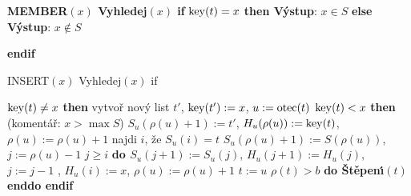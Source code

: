 {\bf MEMBER$(x)$\newline 
Vyhledej$(x)$\newline 
if} $\operatorname{key}(t)=x$ {\bf then V\'ystup}: $x\in S$ {\bf else V\'ystup}: $x\notin S$ {\bf endif
\medskip

INSERT$(x)$\newline
Vyhledej$(x)$\newline 
if} $\operatorname{key}(t)\ne x$ {\bf then}\newline 
\phantom{---}vytvo\v r nov\'y list $t'$, $\operatorname{key}(t'):=x$, $u:=\operatorname{otec}(t)$\newline 
\phantom{---}{\bf if} $\operatorname{key}(t)<x$ {\bf then}\newline 
(koment\'a\v r: $x>\max S$)\newline 
\phantom{------}$S_u(\rho (u)+1):=t'$, $H_u(\rho (u)):=\operatorname{key}(t)$, $\rho (u):=\rho 
(u)+1$\newline 
\phantom{---}{\bf else}\newline 
\phantom{------}najdi $i$, \v ze $S_u(i)=t$\newline 
\phantom{------}$S_u(\rho (u)+1):=S(\rho (u))$, $j:=\rho (u)-1$\newline 
\phantom{------}{\bf while} $j\ge i$ {\bf do\newline 
\phantom{---------}$S_u(j+1):=S_u(j)$}, $H_u(j+1):=H_u(j)$, $j:=j-1$\newline 
{}, $H_u(i):=x$, $\rho (u):=\rho (u)+1$\newline 
\phantom{---}{\bf endif}\newline 
\phantom{---}$t:=u$\newline 
\phantom{---}{\bf while} $\rho (t)>b$ {\bf do \v St\v epen\'\i$(t)$ enddo\newline 
endif}
\medskip

